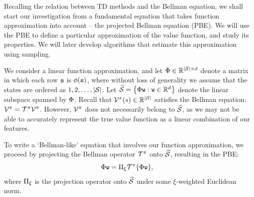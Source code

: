 Recalling the relation between TD methods and the Bellman equation, we shall start our investigation from a fundamental equation that takes function approximation into account -- the projected Bellman equation (PBE). We will use the PBE to define a particular approximation of the value function, and study its properties. We will later develop algorithms that estimate this approximation using sampling.

We consider a linear function approximation, and let $\Phi \in \mathbb{R}^{|\mathcal{S}|\times d}$ denote a matrix in which each row ${\tt s}$ is $\phi({\tt s})$, where without loss of generality we assume that the states are ordered as $1,2,\dots, |\mathcal{S}|$. 
Let $\widehat{\mathcal{S}} = \left\{ \Phi {\tt w}: {\tt w} \in \mathbb{R}^{d} \right\}$ denote the linear subspace spanned by $\Phi$.
Recall that $\mathcal{V}^\pi(s)\in\mathbb{R}^{|\mathcal{S}|}$ satisfies the Bellman equation: $\mathcal{V}^\pi = \mathcal{T}^\pi \mathcal{V}^\pi$. However, $\mathcal{V}^\pi$ does not necessarily belong to $\widehat{\mathcal{S}}$, as we may not be able to accurately represent the true value function as a linear combination of our features. 

To write a `Bellman-like' equation that involves our function approximation, we proceed by projecting the Bellman operator $\mathcal{T}^\pi$ onto $\widehat{\mathcal{S}}$, resulting in the PBE:
\begin{equation}\label{eq:PBE}
    \Phi {\tt w} = \Pi_{\xi} \mathcal{T}^\pi \{\Phi {\tt w}\},
\end{equation}
where $\Pi_{\xi}$ is the projection operator onto $\widehat{\mathcal{S}}$ under some $\xi$-weighted Euclidean norm.

